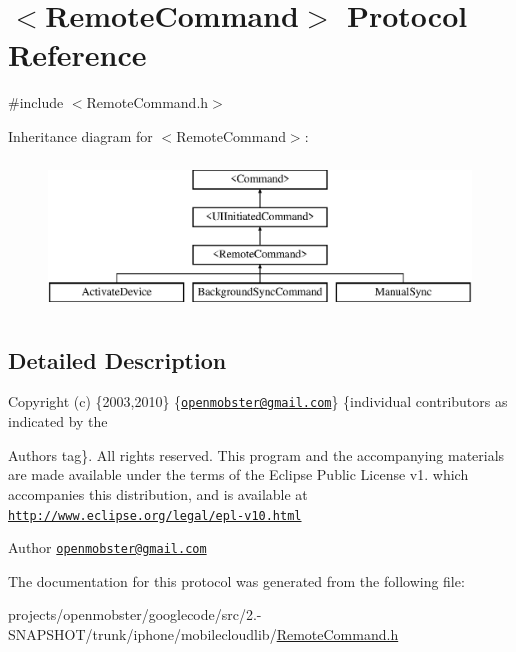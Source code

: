 \hypertarget{protocol_remote_command-p}{
\section{$<$\-Remote\-Command$>$ \-Protocol \-Reference}
\label{protocol_remote_command-p}
}


{\ttfamily \#include $<$\-Remote\-Command.\-h$>$}

\-Inheritance diagram for $<$\-Remote\-Command$>$\-:\begin{figure}[H]
\begin{center}
\leavevmode
\includegraphics[height=4.000000cm]{protocol_remote_command-p}
\end{center}
\end{figure}


\subsection{\-Detailed \-Description}
\-Copyright (c) \{2003,2010\} \{\href{mailto:openmobster@gmail.com}{\tt openmobster@gmail.\-com}\} \{individual contributors as indicated by the \begin{DoxyAuthor}{\-Authors}
tag\}. \-All rights reserved. \-This program and the accompanying materials are made available under the terms of the \-Eclipse \-Public \-License v1. which accompanies this distribution, and is available at \href{http://www.eclipse.org/legal/epl-v10.html}{\tt http\-://www.\-eclipse.\-org/legal/epl-\/v10.\-html}
\end{DoxyAuthor}
\begin{DoxyAuthor}{\-Author}
\href{mailto:openmobster@gmail.com}{\tt openmobster@gmail.\-com} 
\end{DoxyAuthor}


\-The documentation for this protocol was generated from the following file\-:\begin{DoxyCompactItemize}
\item 
projects/openmobster/googlecode/src/2.-\/\-S\-N\-A\-P\-S\-H\-O\-T/trunk/iphone/mobilecloudlib/\hyperlink{_remote_command_8h}{\-Remote\-Command.\-h}\end{DoxyCompactItemize}
